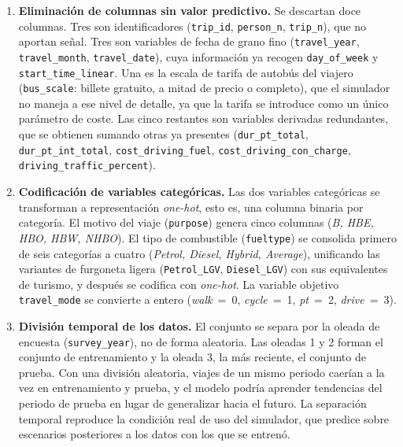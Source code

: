 \begin{enumerate}
  \item \textbf{Eliminación de columnas sin valor predictivo.} Se descartan doce columnas. Tres son identificadores (\texttt{trip\_id}, \texttt{person\_n}, \texttt{trip\_n}), que no aportan señal. Tres son variables de fecha de grano fino (\texttt{travel\_year}, \texttt{travel\_month}, \texttt{travel\_date}), cuya información ya recogen \texttt{day\_of\_week} y \texttt{start\_time\_linear}. Una es la escala de tarifa de autobús del viajero (\texttt{bus\_scale}: billete gratuito, a mitad de precio o completo), que el simulador no maneja a ese nivel de detalle, ya que la tarifa se introduce como un único parámetro de coste. Las cinco restantes son variables derivadas redundantes, que se obtienen sumando otras ya presentes (\texttt{dur\_pt\_total}, \texttt{dur\_pt\_int\_total}, \texttt{cost\_driving\_fuel}, \texttt{cost\_driving\_con\_charge}, \texttt{driving\_traffic\_percent}).\newline

  \item \textbf{Codificación de variables categóricas.} Las dos variables categóricas se transforman a representación \textit{one-hot}, esto es, una columna binaria por categoría. El motivo del viaje (\texttt{purpose}) genera cinco columnas (\textit{B, HBE, HBO, HBW, NHBO}). El tipo de combustible (\texttt{fueltype}) se consolida primero de seis categorías a cuatro (\textit{Petrol, Diesel, Hybrid, Average}), unificando las variantes de furgoneta ligera (\texttt{Petrol\_LGV}, \texttt{Diesel\_LGV}) con sus equivalentes de turismo, y después se codifica con \textit{one-hot}. La variable objetivo \texttt{travel\_mode} se convierte a entero (\textit{walk}~=~0, \textit{cycle}~=~1, \textit{pt}~=~2, \textit{drive}~=~3).
  \newpage

  \item \textbf{División temporal de los datos.} El conjunto se separa por la oleada de encuesta (\texttt{survey\_year}), no de forma aleatoria. Las oleadas 1 y 2 forman el conjunto de entrenamiento y la oleada 3, la más reciente, el conjunto de prueba. Con una división aleatoria, viajes de un mismo periodo caerían a la vez en entrenamiento y prueba, y el modelo podría aprender tendencias del periodo de prueba en lugar de generalizar hacia el futuro. La separación temporal reproduce la condición real de uso del simulador, que predice sobre escenarios posteriores a los datos con los que se entrenó.\newline


\end{enumerate}
